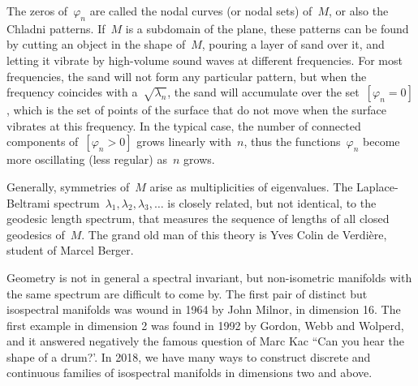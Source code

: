 The zeros of~$\varphi_n$ are called the nodal curves (or nodal sets) of~$M$,
or also the Chladni patterns.  If~$M$ is a subdomain of the plane, these
patterns can be found by cutting an object in the shape of~$M$, pouring a
layer of sand over it, and letting it vibrate by high-volume sound waves at
different frequencies.  For most frequencies, the sand will not form any
particular pattern, but when the frequency coincides with
a~$\sqrt{\lambda_n}$, the sand will accumulate over the set~$[\varphi_n=0]$,
which is the set of points of the surface that do not move when the surface
vibrates at this frequency.  In the typical case, the number of connected
components of~$[\varphi_n>0]$ grows linearly with~$n$, thus the
functions~$\varphi_n$ become more oscillating (less regular) as~$n$ grows.

Generally, symmetries of~$M$ arise as multiplicities of eigenvalues.
The Laplace-Beltrami spectrum~${\lambda_1,\lambda_2,\lambda_3,\ldots}$ is
closely related, but not identical, to the geodesic length spectrum, that
measures the sequence of lengths of all closed geodesics of~$M$.  The grand
old man of this theory is Yves Colin de Verdière, student of Marcel Berger.

Geometry is not in general a spectral invariant, but non-isometric manifolds
with the same spectrum are difficult to come by.  The first pair of distinct
but isospectral manifolds was wound in 1964 by John Milnor, in dimension 16.
The first example in dimension 2 was found in 1992 by Gordon, Webb and
Wolperd, and it answered negatively the famous question of Marc Kac ``Can you
hear the shape of a drum?'.
In 2018, we have many ways to construct discrete and continuous families of
isospectral manifolds in dimensions two and above.



